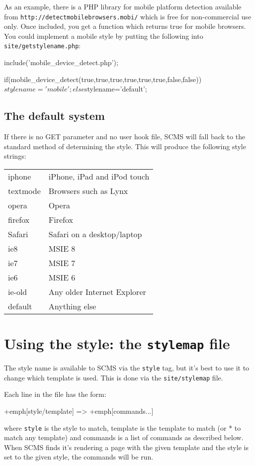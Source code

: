 As an example, there is a PHP library for mobile platform detection available from \texttt{http://detectmobilebrowsers.mobi/}
which is free for non-commercial use only. Once included, you get a function which returns true 
for mobile browsers. You could implement a mobile style by putting the following into \texttt{site/getstylename.php}:
\begin{MyVerbatim}
include('mobile_device_detect.php');

if(mobile_device_detect(true,true,true,true,true,true,false,false))
   $stylename='mobile';
else
   $stylename='default';
\end{MyVerbatim}

\subsection{The default system}
If there is no GET parameter and no user hook file, SCMS will fall back to the standard method
of determining the style. This will produce the following style strings:
\begin{center}
\begin{longtable}{ll}

iphone & iPhone, iPad and iPod touch \\
textmode & Browsers such as Lynx \\
opera & Opera \\
firefox & Firefox \\
Safari & Safari on a desktop/laptop \\
ie8 & MSIE 8\\
ie7 & MSIE 7\\
ie6 & MSIE 6\\
ie-old & Any older Internet Explorer \\
default & Anything else
\end{longtable}
\end{center}

\clearpage
\section{Using the style: the \texttt{stylemap} file}
The style name is available to SCMS via the \texttt{style} tag,
but it's best to use it to change which template is used. This is done
via the \texttt{site/stylemap} file.

Each line in the file has the form:
\begin{MyVerbatim}[commandchars=+\[\]]
+emph[style/template] => +emph[commands...]
\end{MyVerbatim}
where \texttt{style} is the style to match, template is the template to match
(or * to match any template)
and commands is a list of commands as described below.
When SCMS finds it's rendering a page with the given template and the style
is set to the given style, the commands will be run.

